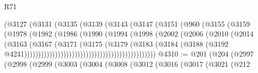 \begin{lexlean}{R71}
\begin{coremodule}
                                        (@3127
                                          (@3131
                                            (@3135
                                              (@3139
                                                (@3143
                                                  (@3147
                                                    (@3151
                                                      (@960
                                                        (@3155
                                                          (@3159
                                                            (@1978
                                                              (@1982
                                                                (@1986
                                                                  (@1990
                                                                    (@1994
                                                                      (@1998
                                                                        (@2002
                                                                          (@2006
                                                                            (@2010
                                                                              (@2014
                                                                                (@3163
                                                                                  (@3167
                                                                                    (@3171
                                                                                      (@3175
                                                                                        (@3179
                                                                                          (@3183
                                                                                            (@3184
                                                                                              (@3188
                                                                                                (@3192
                                                                                                  @4241)))))))))))))))))))))))))))))))))))))))))))))))
@4310 := @201
    (@204
      (@2997
        (@2998
          (@2999
            (@3003
              (@3004
                (@3008
                  (@3012
                    (@3016
                      (@3017
                        (@3021
                          (@212

\end{coremodule}
\end{lexlean}
